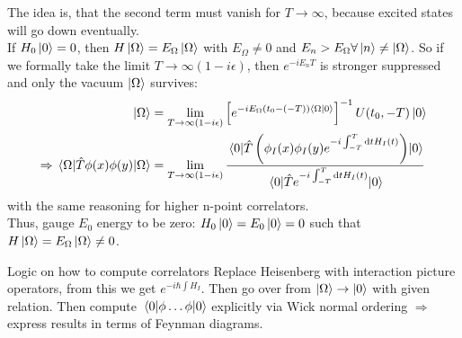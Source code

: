 The idea is, that the second term must vanish for $T\rightarrow \infty$, because excited states will go down eventually.\\
If $H_0 \ket{0}=0$, then $H\ket{\Omega} =E_{\Omega}\ket{\Omega}$ with $E_{\Omega}\neq 0$ and $E_n > E_{\Omega} \forall \ket{n} \neq \ket{\Omega}$. So if we formally take the limit $T\rightarrow\infty(1-i\epsilon)$, then $e^{-i E_n T}$ is stronger suppressed and only the vacuum $\ket{\Omega}$ survives:
\begin{align}
	\ket{\Omega} &= \lim_{T\rightarrow\infty(1-i\epsilon)} \left[e^{-i E_{\Omega} (t_0 - (-T)) \braket{\Omega}{0}}\right]^{-1} U(t_0,-T) \ket{0} \\
	\Rightarrow \expval{\hat{T}\phi(x) \phi(y)}{\Omega} &= \lim_{T\rightarrow \infty(1-i \epsilon)} \frac{\expval{\hat{T} \left(\phi_I(x) \phi_I(y) e^{-i \int_{-T}^{T} \mathrm{d}t H_I(t)} \right)}{0}}{\expval{\hat{T} e^{-i \int_{-T}^{T} \mathrm{d}t H_I(t)}}{0}}
\end{align}
with the same reasoning for higher n-point correlators.\\
Thus, gauge $E_0$ energy to be zero: $H_0 \ket{0}=E_0 \ket{0}=0$ such that $H\ket{\Omega} =E_{\Omega} \ket{\Omega} \neq 0$.
\begin{mybox}{Logic on how to compute correlators}
	Replace Heisenberg with interaction picture operators, from this we get $e^{-i \hbar \int H_I}$. Then go over from $\ket{\Omega}\rightarrow\ket{0}$ with given relation. Then compute $\expval{\phi \dots \phi}{0}$ explicitly via Wick normal ordering $\Rightarrow$ express results in terms of Feynman diagrams.
\end{mybox}

